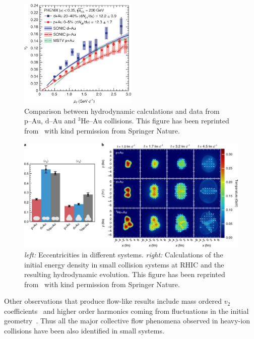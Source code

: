 \begin{figure}[htb]
\centering

		\includegraphics[width=0.5\textwidth]{figures/41567_2018_360_Fig4_HTML.png}
                \caption{Comparison between hydrodynamic calculations and data from $\mbox{p--Au}$, $\mbox{d--Au}$ and $^3\mbox{He--Au}$ collisions. This figure has been reprinted from~\cite{PHENIX:2018lia} with kind permission from Springer Nature.}
	\label{fig:smallsystems1}
\end{figure}

\begin{figure}[b!]
\centering
            	\includegraphics[width=\textwidth]{figures/PhenixNature_1.png}
	\caption{\emph{left:} Eccentricities in different systems. \emph{right:} Calculations of the initial energy density in small collision systems at RHIC and the resulting hydrodynamic evolution. This figure has been reprinted from~\cite{PHENIX:2018lia} with kind permission from Springer Nature.}
	\label{fig:smallhydro}
	\end{figure}


Other observations that produce flow-like results include mass ordered $v_2$ coefficients~\cite{CMS:2018rfr} and higher order harmonics coming from fluctuations in the initial geometry~\cite{Acharya:2017ino}. Thus all the major collective flow phenomena observed in heavy-ion collisions have been also identified in small systems.

